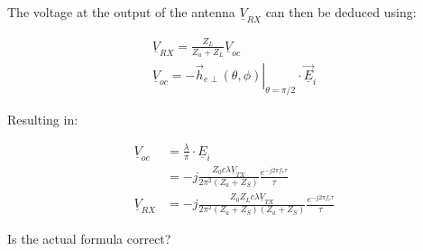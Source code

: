 \documentclass[10pt,a4paper]{ULBreport}
\begin{document}
The voltage at the output of the antenna $\underline{V}_{RX}$ can then be deduced using:

\begin{align*}
    \underline{V}_{RX} = \frac{Z_L}{Z_a + Z_L} \underline{V}_{oc}\\
    \underline{V}_{oc} = -\left . \vec{h}_{e\perp}(\theta, \phi)\right\vert_{\theta = \pi/2} \cdot \underline{\vec{E}}_i
\end{align*}

Resulting in:

\begin{align*}
    \underline{V}_{oc} &= \frac{\lambda}{\pi} \cdot \underline{E}_i\\
    &= -j\frac{Z_0 c \lambda \underline{V}_{TX}}{2\pi^2 (Z_a + Z_S)}\frac{e^{-j 2\pi f_c \tau}}{\tau}\\
    \underline{V}_{RX} &= -j\frac{Z_0 Z_L c \lambda \underline{V}_{TX}}{2\pi^2 (Z_a + Z_S) (Z_a+Z_S)}\frac{e^{-j 2\pi f_c \tau}}{\tau}
\end{align*}

\huge Is the actual formula correct?




\end{document}

